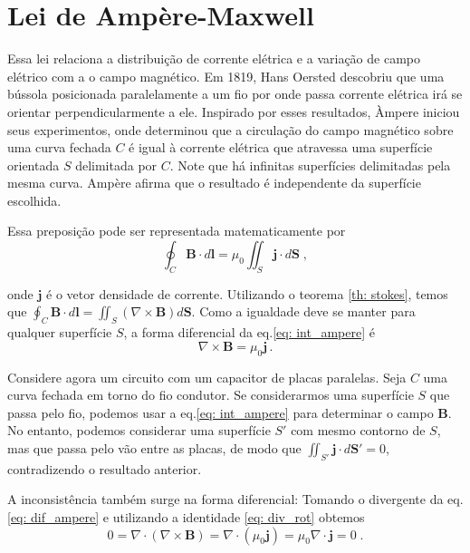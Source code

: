 \section{Lei de Ampère-Maxwell}

Essa lei relaciona a distribuição de corrente elétrica e a variação de campo elétrico com a o campo magnético.
Em 1819, Hans Oersted descobriu que uma bússola posicionada paralelamente a um fio por onde passa corrente elétrica irá se orientar perpendicularmente a ele.
Inspirado por esses resultados, Àmpere iniciou seus experimentos, onde determinou que a circulação do campo magnético sobre uma curva fechada $C$ é igual à corrente elétrica que atravessa uma superfície orientada $S$ delimitada por $C$.
Note que há infinitas superfícies delimitadas pela mesma curva.
Ampère afirma que o resultado é independente da superfície escolhida.

Essa preposição pode ser representada matematicamente por
\begin{equation}
    \oint_C \mathbf B \cdot d\mathbf l = \mu_0 \iint_S \mathbf j \cdot d\mathbf S \;,
    \label{eq: int_ampere}
\end{equation}

\noindent onde $\mathbf j$ é o vetor densidade de corrente. Utilizando o teorema \ref{th: stokes}, temos que $\oint_C \mathbf B \cdot d\mathbf l = \iint_S (\nabla \times \mathbf B) d\mathbf S$. Como a igualdade deve se manter para qualquer superfície $S$, a forma diferencial da eq.\eqref{eq: int_ampere} é
\begin{equation}
    \nabla \times \mathbf B = \mu_0 \mathbf j \,.
    \label{eq: dif_ampere}
\end{equation}

Considere agora um circuito com um capacitor de placas paralelas.
Seja $C$ uma curva fechada em torno do fio condutor.
Se considerarmos uma superfície $S$ que passa pelo fio, podemos usar a eq.\eqref{eq: int_ampere} para determinar o campo $\mathbf B$.
No entanto, podemos considerar uma superfície $S'$ com mesmo contorno de $S$, mas que passa pelo vão entre as placas, de modo que $\iint_{S'} \mathbf j \cdot d\mathbf S' = 0$, contradizendo o resultado anterior.

A inconsistência também surge na forma diferencial:
Tomando o divergente da eq.\eqref{eq: dif_ampere} e utilizando a identidade \ref{eq: div_rot} obtemos
\begin{equation}
    0 = \nabla \cdot (\nabla \times \mathbf B) = \nabla \cdot (\mu_0 \mathbf j) = \mu_0 \nabla \cdot \mathbf j = 0 \;.
\end{equation}

